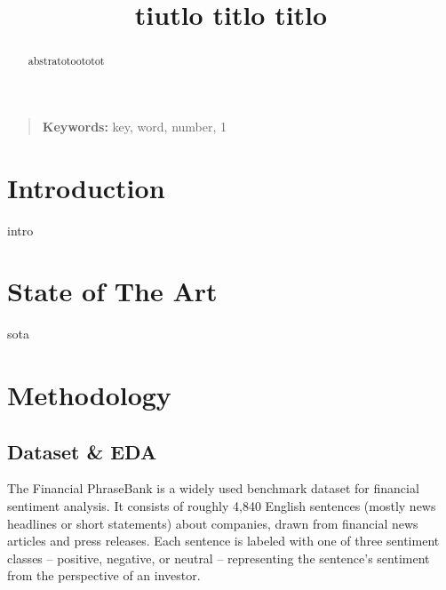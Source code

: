 \documentclass[conference]{IEEEtran}
\begin{document}
\title{tiutlo titlo titlo}

\author{
\and
{}
}

\maketitle
\thispagestyle{plain}

\begin{abstract}
abstratotoototot
\end{abstract}

\begin{quote}
\small
\noindent
\textbf{Keywords:} key, word, number, 1
\end{quote}

\IEEEpeerreviewmaketitle


\section{Introduction}

intro

\section{State of The Art}

sota 

\section{Methodology}

\subsection{Dataset \& EDA}

The Financial PhraseBank is a widely used benchmark dataset for financial sentiment analysis. It consists of roughly 4,840 English sentences (mostly news headlines or short statements) about companies, drawn from financial news articles and press releases. Each sentence is labeled with one of three sentiment classes – positive, negative, or neutral – representing the sentence’s sentiment from the perspective of an investor.
\end{document}
